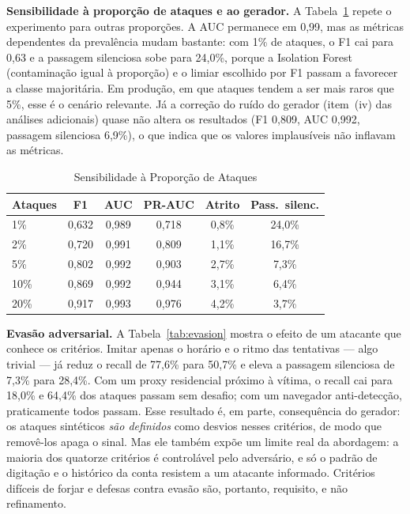 \documentclass[conference]{IEEEtran}
\begin{document}
\textbf{Sensibilidade à proporção de ataques e ao gerador.} A
Tabela~\ref{tab:prop} repete o experimento para outras proporções. A AUC
permanece em 0,99, mas as métricas dependentes da prevalência mudam
bastante: com 1\% de ataques, o F1 cai para 0,63 e a passagem silenciosa
sobe para 24,0\%, porque a Isolation Forest (contaminação igual à
proporção) e o limiar escolhido por F1 passam a favorecer a classe
majoritária. Em produção, em que ataques tendem a ser mais raros que 5\%,
esse é o cenário relevante. Já a correção do ruído do gerador (item~(iv)
das análises adicionais) quase não altera os resultados (F1 0,809, AUC
0,992, passagem silenciosa 6,9\%), o que indica que os valores
implausíveis não inflavam as métricas.

\begin{table}[t]
\caption{Sensibilidade à Proporção de Ataques}
\label{tab:prop}
\centering
\footnotesize
\setlength{\tabcolsep}{4pt}
\renewcommand{\arraystretch}{1.15}
\begin{tabular}{@{}lccccc@{}}
\toprule
\textbf{Ataques} & \textbf{F1} & \textbf{AUC} & \textbf{PR-AUC} & \textbf{Atrito} & \textbf{Pass.\ silenc.} \\
\midrule
1\%  & 0,632 & 0,989 & 0,718 & 0,8\% & 24,0\% \\
2\%  & 0,720 & 0,991 & 0,809 & 1,1\% & 16,7\% \\
5\%  & 0,802 & 0,992 & 0,903 & 2,7\% & 7,3\% \\
10\% & 0,869 & 0,992 & 0,944 & 3,1\% & 6,4\% \\
20\% & 0,917 & 0,993 & 0,976 & 4,2\% & 3,7\% \\
\bottomrule
\end{tabular}
\end{table}

\textbf{Evasão adversarial.} A Tabela~\ref{tab:evasion} mostra o efeito de
um atacante que conhece os critérios. Imitar apenas o horário e o ritmo
das tentativas --- algo trivial --- já reduz o recall de 77,6\% para
50,7\% e eleva a passagem silenciosa de 7,3\% para 28,4\%. Com um proxy
residencial próximo à vítima, o recall cai para 18,0\% e 64,4\% dos
ataques passam sem desafio; com um navegador anti-detecção, praticamente
todos passam. Esse resultado é, em parte, consequência do gerador: os
ataques sintéticos \emph{são definidos} como desvios nesses critérios, de
modo que removê-los apaga o sinal. Mas ele também expõe um limite real
da abordagem: a maioria dos quatorze critérios é controlável pelo
adversário, e só o padrão de digitação e o histórico da conta resistem a
um atacante informado. Critérios difíceis de forjar e defesas contra
evasão são, portanto, requisito, e não refinamento.
\end{document}
